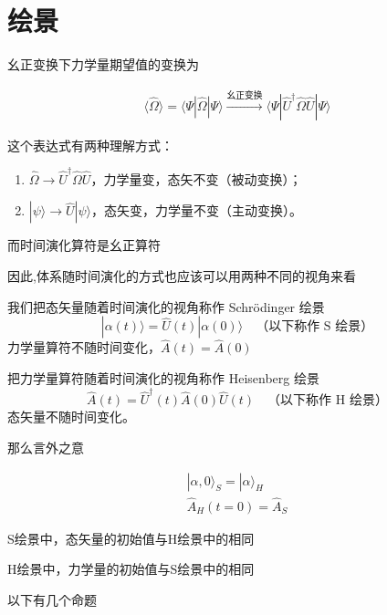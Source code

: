 \documentclass[lang=cn,10pt]{elegantbook}
\begin{document}
\section{绘景}
幺正变换下力学量期望值的变换为

\begin{align*}
	\langle \hat{\Omega} \rangle = \langle \Psi | \hat{\Omega} | \Psi \rangle \xrightarrow{\text{幺正变换}} \langle \Psi | \hat{U}^\dagger \hat{\Omega} \hat{U} | \Psi \rangle
\end{align*}

这个表达式有两种理解方式：
\begin{enumerate}
	\item $\hat{\Omega} \longrightarrow \hat{U}^\dagger \hat{\Omega} \hat{U}$，力学量变，态矢不变（被动变换）；
	\item $|\psi\rangle \longrightarrow \hat{U} |\psi\rangle$，态矢变，力学量不变（主动变换）。
\end{enumerate}

而时间演化算符是幺正算符

因此,体系随时间演化的方式也应该可以用两种不同的视角来看

我们把态矢量随着时间演化的视角称作 Schrödinger 绘景
\[ |\alpha(t)\rangle = \hat{U}(t) |\alpha(0)\rangle \quad \text{（以下称作 S 绘景）} \]
力学量算符不随时间变化，\( \hat{A}(t) = \hat{A}(0) \)

把力学量算符随着时间演化的视角称作 Heisenberg 绘景
\[ \hat{A}(t) = \hat{U}^\dagger(t) \hat{A}(0) \hat{U}(t) \quad \text{（以下称作 H 绘景）} \]
态矢量不随时间变化。

那么言外之意

\begin{align*}
	|\alpha, 0\rangle_{S} = |\alpha\rangle_{H} \\
	\hat{A}_{H}(t=0) = \hat{A}_{S}
\end{align*}

S绘景中，态矢量的初始值与H绘景中的相同


H绘景中，力学量的初始值与S绘景中的相同

以下有几个命题
\end{document}
